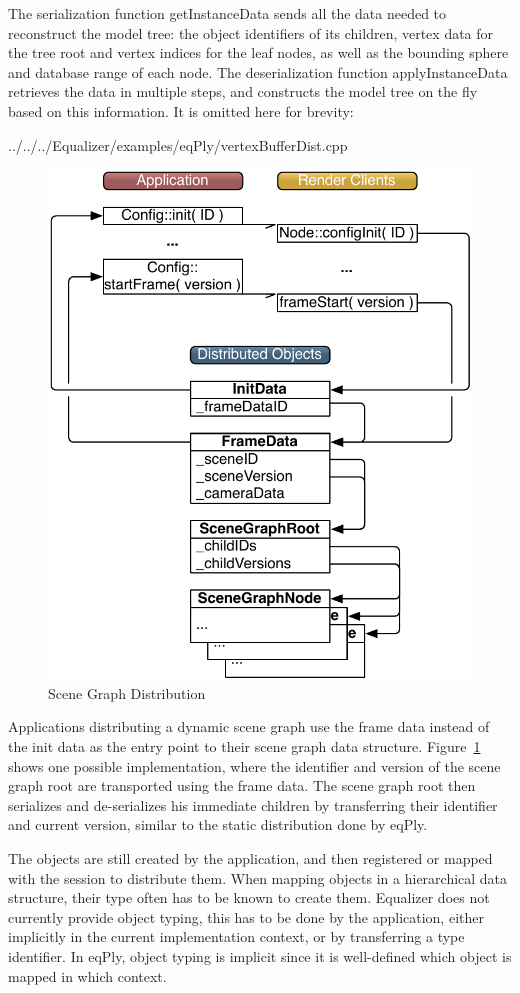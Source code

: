 \documentclass[10pt,a4]{scrartcl}
\newcommand{\fig}[1]{Figure~\ref{#1}}
\begin{document}
The serialization function \textsf{getInstanceData} sends all the data
needed to reconstruct the model tree: the object identifiers of its
children, vertex data for the tree root and vertex indices for the leaf
nodes, as well as the bounding sphere and database range of each
node. The deserialization function \textsf{applyInstanceData} retrieves
the data in multiple steps, and constructs the model tree on the fly
based on this information. It is omitted here for brevity:

{\footnotesize
  {../../../Equalizer/examples/eqPly/vertexBufferDist.cpp}}

\begin{figure}[ht!]\center
  \includegraphics[width=.618\textwidth]{images/objects.pdf}
  {\caption{\label{fObjects}Scene Graph Distribution}}
\end{figure}
Applications distributing a dynamic scene graph use the frame data
instead of the init data as the entry point to their scene graph data
structure. \fig{fObjects} shows one possible implementation, where the
identifier and version of the scene graph root are transported using the
frame data. The scene graph root then serializes and de-serializes his
immediate children by transferring their identifier and current version,
similar to the static distribution done by \textsf{eqPly}.

The objects are still created by the application, and then registered or
mapped with the session to distribute them. When mapping
objects in a hierarchical data structure, their type often has to be
known to create them. Equalizer does not currently provide
object typing, this has to be done by the application, either implicitly
in the current implementation context, or by transferring a type
identifier. In \textsf{eqPly}, object typing is implicit since it is
well-defined which object is mapped in which context.
\end{document}
